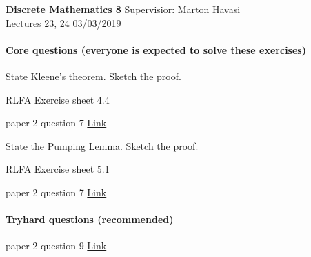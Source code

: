 \documentclass{exam}
\begin{document}
\noindent
\large\textbf{Discrete Mathematics 8} \hfill Supervisior: Marton Havasi \\
\normalsize Lectures 23, 24 \hfill 03/03/2019

\paragraph{Core questions (everyone is expected to solve these exercises)}
\begin{questions}

\question State Kleene's theorem. Sketch the proof.

\question RLFA Exercise sheet 4.4

 paper 2 question 7 \href{http://www.cl.cam.ac.uk/teaching/exams/pastpapers/y1999p2q7.pdf}{Link}

\question State the Pumping Lemma. Sketch the proof.

\question RLFA Exercise sheet 5.1

 paper 2 question 7 \href{http://www.cl.cam.ac.uk/teaching/exams/pastpapers/y1998p2q7.pdf}{Link}

\end{questions}

\paragraph{Tryhard questions (recommended)}
\begin{questions}

 paper 2 question 9 \href{http://www.cl.cam.ac.uk/teaching/exams/pastpapers/y2004p2q9.pdf}{Link}


\end{questions}
\end{document}
